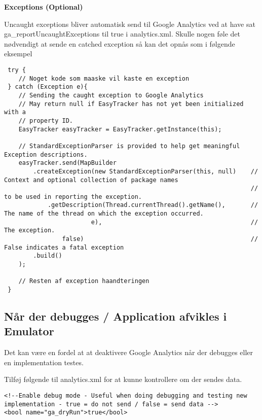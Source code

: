 \textbf{Exceptions (Optional)}

Uncaught exceptions bliver automatisk send til Google Analytics ved at have sat ga\_reportUncaughtExceptions til true i analytics.xml.
Skulle nogen føle det nødvendigt at sende en catched exception så kan det opnås som i følgende eksempel

\begin{lstlisting}
 try {
	// Noget kode som maaske vil kaste en exception
 } catch (Exception e){
	// Sending the caught exception to Google Analytics
	// May return null if EasyTracker has not yet been initialized with a
	// property ID.
	EasyTracker easyTracker = EasyTracker.getInstance(this);

	// StandardExceptionParser is provided to help get meaningful Exception descriptions.
	easyTracker.send(MapBuilder
		.createException(new StandardExceptionParser(this, null)    // Context and optional collection of package names
																	// to be used in reporting the exception.
			.getDescription(Thread.currentThread().getName(),       // The name of the thread on which the exception occurred.
						e),                                         // The exception.
				false)                                              // False indicates a fatal exception
		.build()
	);

	// Resten af exception haandteringen
 }
\end{lstlisting}

\subsection{Når der debugges / Application afvikles i Emulator}
Det kan være en fordel at at deaktivere Google Analytics når der debugges eller en implementation testes.

Tilføj følgende til analytics.xml for at kunne kontrollere om der sendes data.

\begin{lstlisting}
<!--Enable debug mode - Useful when doing debugging and testing new implementation - true = do not send / false = send data -->
<bool name="ga_dryRun">true</bool>
\end{lstlisting}

